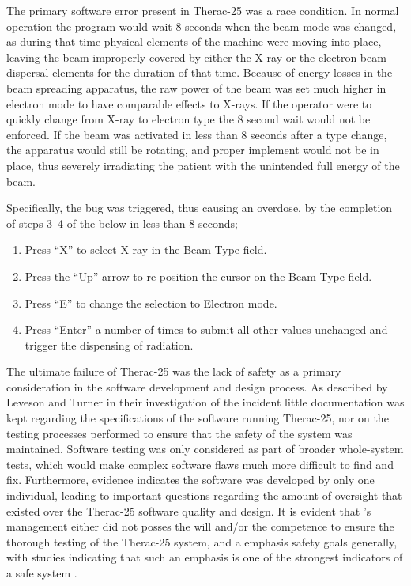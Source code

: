 \documentclass{cshonours}
\newcommand{\ther}{Therac-25\xspace}
\begin{document}
The primary software error present in \ther was a race condition. In normal operation the program would wait 8 seconds when the beam mode was changed, as during that time physical elements of the machine were moving into place, leaving the beam improperly covered by either the X-ray or the electron beam dispersal elements for the duration of that time. Because of energy losses in the beam spreading apparatus, the raw power of the beam was set much higher in electron mode to have comparable effects to X-rays.  If the operator were to quickly change from X-ray to electron type the 8 second wait would not be enforced. If the beam was activated in less than 8 seconds after a type change, the apparatus would still be rotating, and proper implement would not be in place, thus severely irradiating the patient with the unintended full energy of the beam.

Specifically, the bug was triggered, thus causing an overdose, by the completion of steps 3--4 of the below in less than 8 seconds;
\begin{enumerate}
 \item Press ``X'' to select X-ray in the Beam Type field.
 \item Press the ``Up'' arrow to re-position the cursor on the Beam Type field.
 \item Press ``E'' to change the selection to Electron mode.
 \item Press ``Enter'' a number of times to submit all other values unchanged and trigger the dispensing of radiation.
\end{enumerate}

The ultimate failure of \ther was the lack of safety as a primary consideration in the software development and design process. As described by Leveson and Turner \cite{leveson1993investigation} in their investigation of the incident little documentation was kept regarding the specifications of the software running \ther, nor on the testing processes performed to ensure that the safety of the system was maintained. Software testing was only considered as part of broader whole-system tests, which would make complex software flaws much more difficult to find and fix. Furthermore, evidence indicates the software was developed by only one individual, leading to important questions regarding the amount of oversight that existed over the \ther software quality and design. It is evident that \aecl's management either did not posses the will and/or the competence to ensure the thorough testing of the \ther system, and a emphasis safety goals generally, with studies indicating that such an emphasis is one of the strongest indicators of a safe system \cite[p.~415]{saferworld}.
\end{document}
